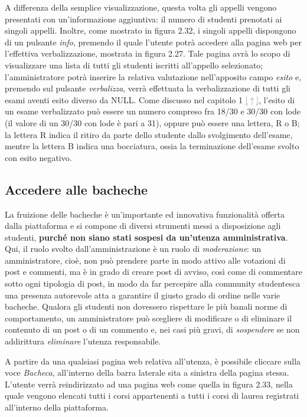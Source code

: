 \documentclass [a4paper,11pt]{book}
\begin{document}
A differenza della semplice visualizzazione, questa volta gli appelli vengono presentati con un'informazione aggiuntiva: il numero di studenti prenotati ai singoli appelli. Inoltre, come mostrato in figura 2.32, i singoli appelli dispongono di un pulsante \emph{info}, premendo il quale l'utente potrà accedere alla pagina web per l'effettiva verbalizzazione, mostrata in figura 2.27. Tale pagina avrà lo scopo di visualizzare una lista di tutti gli studenti iscritti all'appello selezionato; l'amministratore potrà inserire la relativa valutazione nell'apposito campo \emph{esito} e, premendo sul pulsante \emph{verbalizza}, verrà effettuata la verbalizzazione di tutti gli esami aventi esito diverso da NULL. Come discusso nel capitolo 1 \hyperref[sec:specifiche]{\textcolor{gray}{[$\uparrow$]}}, l'esito di un esame verbalizzato può essere un numero compreso fra 18/30 e 30/30 con lode (il valore di un 30/30 con lode è pari a 31), oppure può essere una lettera, R o B; la lettera R indica il ritiro da parte dello studente dallo svolgimento dell'esame, mentre la lettera B indica una bocciatura, ossia la terminazione dell'esame svolto con esito negativo.

\medskip

\subsection{Accedere alle bacheche}

La fruizione delle bacheche è un'importante ed innovativa funzionalità offerta dalla piattaforma e si compone di diversi strumenti messi a disposizione agli studenti, \textbf{purché non siano stati sospesi da un'utenza amministrativa}. Qui, il ruolo svolto dall'amministrazione è un ruolo di \emph{moderazione}: un amministratore, cioè, non può prendere parte in modo attivo alle votazioni di post e commenti, ma è in grado di creare post di avviso, così come di commentare sotto ogni tipologia di post, in modo da far percepire alla community studentesca una presenza autorevole atta a garantire il giusto grado di ordine nelle varie bacheche. Qualora gli studenti non dovessero rispettare le più banali norme di comportamento, un amministratore può scegliere di modificare o di eliminare il contenuto di un post o di un commento e, nei casi più gravi, di \emph{sospendere} se non addirittura \emph{eliminare} l'utenza responsabile.

A partire da una qualsiasi pagina web relativa all'utenza, è possibile cliccare sulla voce \emph{Bacheca}, all'interno della barra laterale sita a sinistra della pagina stessa. L'utente verrà reindirizzato ad una pagina web come quella in figura 2.33, nella quale vengono elencati tutti i corsi appartenenti a tutti i corsi di laurea registrati all'interno della piattaforma.
\end{document}
